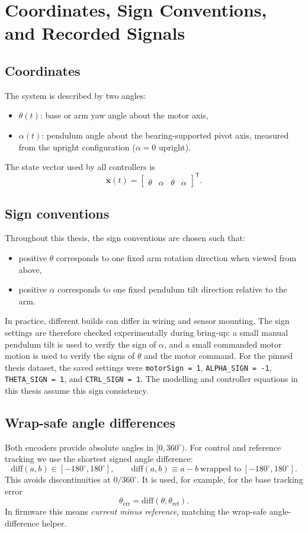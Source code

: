 \section{Coordinates, Sign Conventions, and Recorded Signals}
\label{ch:notation}

\subsection{Coordinates}
The system is described by two angles:
\begin{itemize}
  \item $\theta(t)$: base or arm yaw angle about the motor axis,
  \item $\alpha(t)$: pendulum angle about the bearing-supported pivot axis, measured from the upright configuration ($\alpha=0$ upright).
\end{itemize}
The state vector used by all controllers is
\[
\mathbf{x}(t)=\begin{bmatrix}\theta & \alpha & \dot{\theta} & \dot{\alpha}\end{bmatrix}^\mathsf{T}.
\]

\subsection{Sign conventions}
Throughout this thesis, the sign conventions are chosen such that:
\begin{itemize}
  \item positive $\theta$ corresponds to one fixed arm rotation direction when viewed from above,
  \item positive $\alpha$ corresponds to one fixed pendulum tilt direction relative to the arm.
\end{itemize}
In practice, different builds can differ in wiring and sensor mounting. The sign settings are therefore checked experimentally during bring-up: a small manual pendulum tilt is used to verify the sign of $\alpha$, and a small commanded motor motion is used to verify the signs of $\theta$ and the motor command. For the pinned thesis dataset, the saved settings were \texttt{motorSign = 1}, \texttt{ALPHA\_SIGN = -1}, \texttt{THETA\_SIGN = 1}, and \texttt{CTRL\_SIGN = 1}. The modelling and controller equations in this thesis assume this sign consistency.

\subsection{Wrap-safe angle differences}
Both encoders provide absolute angles in $[0,360^\circ)$. For control and reference tracking we use the shortest signed angle difference:
\[
\mathrm{diff}(a,b)\in[-180^\circ,180^\circ],\qquad \mathrm{diff}(a,b)\equiv a-b\ \text{wrapped to}\ [-180^\circ,180^\circ].
\]
This avoids discontinuities at $0/360^\circ$. It is used, for example, for the base tracking error
\[
\theta_{\mathrm{err}}=\mathrm{diff}(\theta,\theta_{\mathrm{ref}}).
\]
In firmware this means \emph{current minus reference}, matching the
wrap-safe angle-difference helper.

